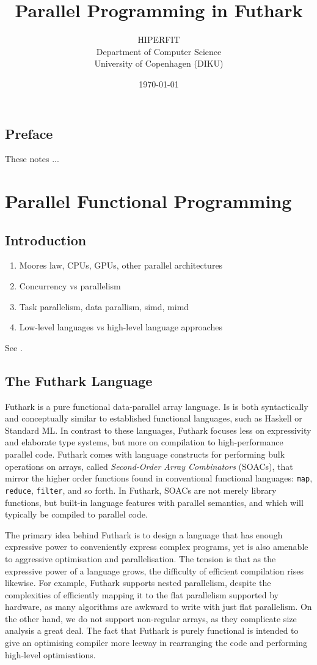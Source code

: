 \documentclass[11pt]{book}
\title{\bf Parallel Programming in Futhark}
\author{HIPERFIT \\ Department of Computer Science \\ University of Copenhagen (DIKU)}
\date{\today}
\begin{document}
\frontmatter
\maketitle
\chapter{Preface}

These notes ...

\tableofcontents
\mainmatter
\part{Parallel Functional Programming}
\chapter{Introduction}

\begin{enumerate}
\item Moores law, CPUs, GPUs, other parallel architectures
\item Concurrency vs parallelism
\item Task parallelism, data parallism, simd, mimd
\item Low-level languages vs high-level language approaches
\end{enumerate}

See \cite{finpar}.

\chapter{The Futhark Language}

Futhark is a pure functional data-parallel array language.  Is is both
syntactically and conceptually similar to established functional
languages, such as Haskell or Standard ML.  In contrast to these
languages, Futhark focuses less on expressivity and elaborate type
systems, but more on compilation to high-performance parallel code.
Futhark comes with language constructs for performing bulk operations
on arrays, called \textit{Second-Order Array Combinators} (SOACs),
that mirror the higher order functions found in conventional
functional languages: \texttt{map}, \texttt{reduce}, \texttt{filter},
and so forth.  In Futhark, SOACs are not merely library functions, but
built-in language features with parallel semantics, and which will
typically be compiled to parallel code.

The primary idea behind Futhark is to design a language that has
enough expressive power to conveniently express complex programs, yet
is also amenable to aggressive optimisation and parallelisation.  The
tension is that as the expressive power of a language grows, the
difficulty of efficient compilation rises likewise.  For example,
Futhark supports nested parallelism, despite the complexities of
efficiently mapping it to the flat parallelism supported by hardware,
as many algorithms are awkward to write with just flat parallelism.
On the other hand, we do not support non-regular arrays, as they
complicate size analysis a great deal.  The fact that Futhark is
purely functional is intended to give an optimising compiler more
leeway in rearranging the code and performing high-level
optimisations.
\end{document}

